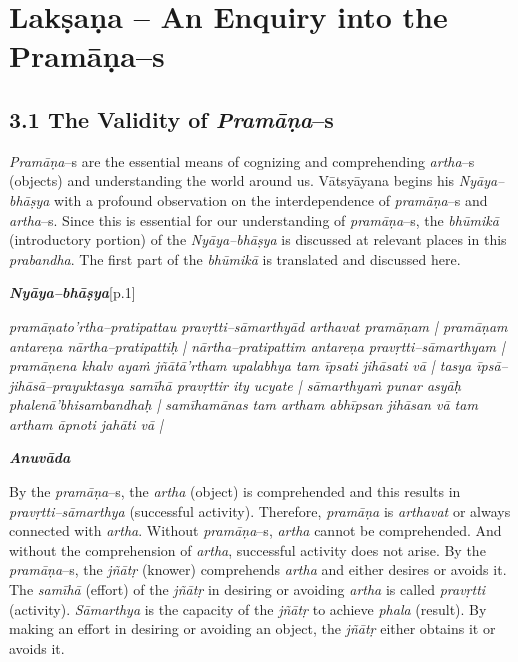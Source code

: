 
\chapter{Lakṣaṇa – An Enquiry into the Pramāṇa–s}\label{chapter8}

\section*{3.1 The Validity of \textit{Pramāṇa}–s}

\textit{Pramāṇa}–s are the essential means of cognizing and comprehending \textit{artha}–s (objects) and understanding the world around us. Vātsyāyana begins his \textit{Nyāya–bhāṣya} with a profound observation on the interdependence of \textit{pramāṇa}–s and \textit{artha}–s. Since this is essential for our understanding of \textit{pramāṇa}–s, the \textit{bhūmikā} (introductory portion) of the \textit{Nyāya–bhāṣya} is discussed at relevant places in this \textit{prabandha}. The first part of the \textit{bhūmikā} is translated and discussed here.

\textit{\textbf{Nyāya–bhāṣya}}[p.1]

\begin{myquote}
\textit{pramāṇato'rtha–pratipattau pravṛtti–sāmarthyād arthavat pramāṇam | pramāṇam antareṇa nārtha–pratipattiḥ | nārtha–pratipattim antareṇa pravṛtti–sāmarthyam | pramāṇena khalv ayaṁ jñātā'rtham upalabhya tam īpsati jihāsati vā | tasya īpsā–jihāsā–prayuktasya samīhā pravṛttir ity ucyate | sāmarthyaṁ punar asyāḥ phalenā’bhisambandhaḥ | samīhamānas tam artham abhīpsan jihāsan vā tam artham āpnoti jahāti vā | }
\end{myquote}

\textit{\textbf{Anuvāda}}

By the \textit{pramāṇa}–s, the \textit{artha} (object) is comprehended and this results in \textit{pravṛtti–sāmarthya} (successful activity). Therefore, \textit{pramāṇa} is \textit{arthavat} or always connected with \textit{artha}. Without \textit{pramāṇa}–s, \textit{artha} cannot be comprehended. And without the comprehension of \textit{artha}, successful activity does not arise. By the \textit{pramāṇa}–s, the \textit{jñātṛ} (knower) comprehends \textit{artha} and either desires or avoids it. The \textit{samīhā} (effort) of the \textit{jñātṛ} in desiring or avoiding \textit{artha} is called \textit{pravṛtti} (activity). \textit{Sāmarthya} is the capacity of the \textit{jñātṛ} to achieve \textit{phala} (result). By making an effort in desiring or avoiding an object, the \textit{jñātṛ} either obtains it or avoids it.

